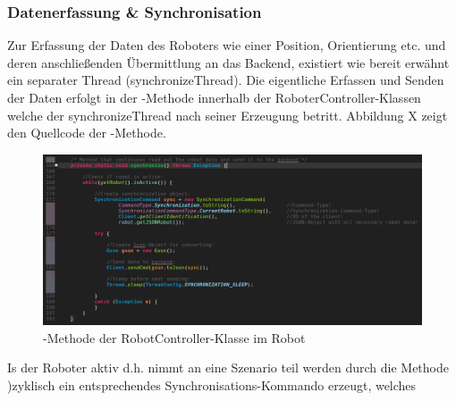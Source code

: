 \subsubsection{Datenerfassung \& Synchronisation}\label{robotdatenerfassung}
Zur Erfassung der Daten des Roboters wie einer Position, Orientierung etc. und deren anschließenden Übermittlung an das Backend, 
existiert wie bereit erwähnt ein separater Thread (synchronizeThread). Die eigentliche Erfassen und Senden der Daten erfolgt in der 
-Methode innerhalb der RoboterController-Klassen welche der synchronizeThread nach seiner Erzeugung betritt.
Abbildung X zeigt den Quellcode der -Methode.
\begin{figure}[ht]
	\centering
	\includegraphics[width=1.0\textwidth]{images/implementation/synchronizeMethod.png}
	\caption[-Methode der RobotController-Klasse im Robot]{-Methode der RobotController-Klasse im Robot}
\end{figure}
\newline
Is der Roboter aktiv d.h. nimmt an eine Szenario teil werden durch die Methode )zyklisch ein entsprechendes Synchronisations-Kommando erzeugt, welches
